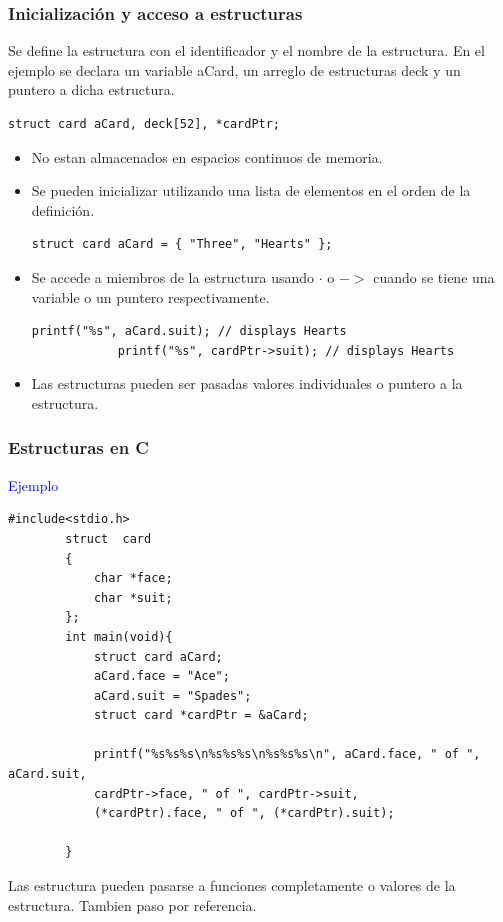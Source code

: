 \documentclass[10.5pt,scale=1.0,t,aspectratio=169,hyperref={pdfpagelabels=false}]{beamer}
\begin{document}
\begin{frame}[fragile]
	\frametitle{Inicializaci\'on y acceso a estructuras}
	Se define la estructura con el identificador y el nombre de la estructura. En el ejemplo se declara un variable aCard, un arreglo de estructuras deck y un puntero a dicha estructura.
	\begin{lstlisting}[style=CStyle]
		struct card aCard, deck[52], *cardPtr;
	\end{lstlisting}
	\begin{itemize}
		\item No estan almacenados en espacios continuos de memoria. 
		\item Se pueden inicializar utilizando una lista de elementos en el orden de la definici\'on.
		\begin{lstlisting}[style=CStyle]
			struct card aCard = { "Three", "Hearts" };
		\end{lstlisting}
		\item Se accede a miembros de la estructura usando $\cdot$ o $->$ cuando se tiene una variable o un puntero respectivamente.
		\begin{lstlisting}[style=CStyle]
			printf("%s", aCard.suit); // displays Hearts
			printf("%s", cardPtr->suit); // displays Hearts
		\end{lstlisting}
		\item Las estructuras pueden ser pasadas valores individuales o puntero a la estructura.
	\end{itemize}
\end{frame}

\begin{frame}[fragile]
	\frametitle{Estructuras en C}
	\textcolor{blue}{Ejemplo}
	
	\begin{lstlisting}[style=CStyle]
		#include<stdio.h>
		struct  card
		{
			char *face;
			char *suit;
		};
		int main(void){
			struct card aCard;
			aCard.face = "Ace";
			aCard.suit = "Spades";
			struct card *cardPtr = &aCard;
			
			printf("%s%s%s\n%s%s%s\n%s%s%s\n", aCard.face, " of ", aCard.suit,
			cardPtr->face, " of ", cardPtr->suit,
			(*cardPtr).face, " of ", (*cardPtr).suit);
			
		}
	\end{lstlisting}

	Las estructura pueden pasarse a funciones completamente o valores de la estructura. Tambien paso por referencia. 
\end{frame}
\end{document}
